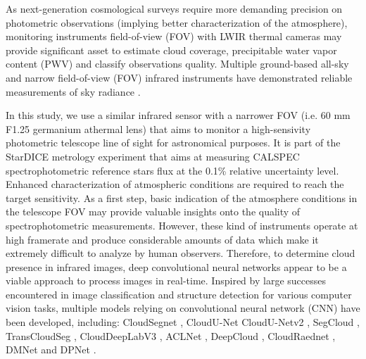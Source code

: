 \documentclass[amt, article]{copernicus}
\begin{document}
As next-generation cosmological surveys require more demanding precision on photometric observations (implying better characterization of the atmosphere), monitoring instruments field-of-view (FOV) with LWIR thermal cameras may provide significant asset to estimate cloud coverage, precipitable water vapor content (PWV) and classify observations quality. Multiple ground-based all-sky and narrow field-of-view (FOV) infrared instruments have demonstrated reliable measurements of sky radiance \citep{Klebe2012, Klebe2014}.

In this study, we use a similar infrared sensor with a narrower FOV (i.e. 60 mm F1.25 germanium athermal lens) that aims to monitor a high-sensivity photometric telescope line of sight for astronomical purposes. It is part of the StarDICE metrology experiment \citep{stardice1} that aims at measuring CALSPEC \citep{Bohlin2014} spectrophotometric reference stars flux at the 0.1\% relative uncertainty level. Enhanced characterization of atmospheric conditions are required to reach the target sensitivity. As a first step, basic indication of the atmosphere conditions in the telescope FOV may provide valuable insights onto the quality of spectrophotometric measurements. However, these kind of instruments operate at high framerate and produce considerable amounts of data which make it extremely difficult to analyze by human observers. Therefore, to determine cloud presence in infrared images, deep convolutional neural networks appear to be a viable approach to process images in real-time. Inspired by large successes encountered in image classification and structure detection for various computer vision tasks, multiple models relying on convolutional neural network (CNN) have been developed, including: CloudSegnet \citep{dev2019cloudsegnet}, CloudU-Net \citep{CloudUNet} CloudU-Netv2 \citep{CloudUNetv2}, SegCloud \citep{SegCloud}, TransCloudSeg \citep{TransCloudSeg}, CloudDeepLabV3 \citep{CloudDeepLabV3}, ACLNet \citep{makwana2022aclnet}, DeepCloud \citep{DeepCloud}, CloudRaednet \citep{shi2022cloudraednet}, DMNet \citep{DMNet} and DPNet \cite{DPNet}.
\end{document}
